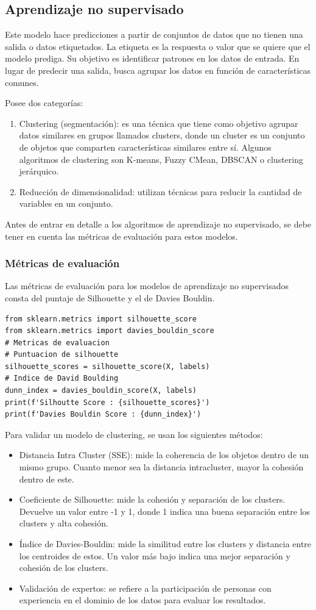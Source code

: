 \documentclass[a4paper, 12pt]{book}
\begin{document}
\subsection{Aprendizaje no supervisado}
Este modelo hace predicciones a partir de conjuntos de datos que no tienen una salida o datos etiquetados. La etiqueta es la respuesta o valor que se quiere que el modelo prediga. Su objetivo es identificar patrones en los datos de entrada. En lugar de predecir una salida, busca agrupar los datos en función de características comunes.

Posee dos categorías:
\begin{enumerate}
	\item Clustering (segmentación): es una técnica que tiene como objetivo agrupar datos similares en grupos llamados clusters, donde un cluster es un conjunto de objetos que comparten características similares entre sí. Algunos algoritmos de clustering son K-means, Fuzzy CMean, DBSCAN o clustering jerárquico.
	\item Reducción de dimensionalidad: utilizan técnicas para reducir la cantidad de variables en un conjunto.
\end{enumerate}
Antes de entrar en detalle a los algoritmos de aprendizaje no supervisado, se debe tener en cuenta las métricas de evaluación para estos modelos.
\subsubsection{Métricas de evaluación}
Las métricas de evaluación para los modelos de aprendizaje no supervisados consta del puntaje de Silhouette y el de Davies Bouldin.
\begin{verbatim}
from sklearn.metrics import silhouette_score
from sklearn.metrics import davies_bouldin_score
# Metricas de evaluacion
# Puntuacion de silhouette
silhouette_scores = silhouette_score(X, labels)
# Indice de David Boulding
dunn_index = davies_bouldin_score(X, labels)
print(f'Silhoutte Score : {silhouette_scores}')
print(f'Davies Bouldin Score : {dunn_index}')
\end{verbatim}
Para validar un modelo de clustering, se usan los siguientes métodos:
\begin{itemize}
	\item Distancia Intra Cluster (SSE): mide la coherencia de los objetos dentro de un mismo grupo. Cuanto menor sea la distancia intracluster, mayor la cohesión dentro de este.
	\item Coeficiente de Silhouette: mide la cohesión y separación de los clusters. Devuelve un valor entre -1 y 1, donde 1 indica una buena separación entre los clusters y alta cohesión.
	\item Índice de Davies-Bouldin: mide la similitud entre los clusters y distancia entre los centroides de estos. Un valor más bajo indica una mejor separación y cohesión de los clusters.
	\item Validación de expertos: se refiere a la participación de personas con experiencia en el dominio de los datos para evaluar los resultados.
\end{itemize}
\end{document}
